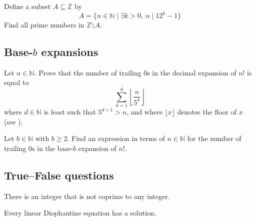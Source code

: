 \begin{chapex}
Define a subset $A \subseteq \mathbb{Z}$ by
\[ A = \{ n \in \mathbb{N} \mid \exists k > 0,~ n \mid 12^k-1 \} \]
Find all prime numbers in $\mathbb{Z} \setminus A$.
\end{chapex}

\subsection*{Base-$b$ expansions}

\begin{chapex}
\label{cqTrailingZerosOfFactorialByInduction}
Let $n \in \mathbb{N}$. Prove that the number of trailing $0$s in the decimal expansion of $n!$ is equal to
\[ \sum_{k=1}^d \left\lfloor \dfrac{n}{5^k} \right \rfloor \]
where $d \in \mathbb{N}$ is least such that $5^{d+1}>n$, and where $\lfloor x \rfloor$  denotes the floor of $x$ (see ).
\end{chapex}

\begin{chapex}
\label{cqTrailingZerosOfFactorialByInductionBaseB}
Let $b \in \mathbb{N}$ with $b \ge 2$. Find an expression in terms of $n \in \mathbb{N}$ for the number of trailing $0$s in the base-$b$ expansion of $n!$.
\end{chapex}

\subsection*{True--False questions}


\begin{chapex} %
\label{cqNumberTheoryTFBegin}
There is an integer that is not coprime to any integer.
\end{chapex}

\begin{chapex} %
Every linear Diophantine equation has a solution.
\end{chapex}

